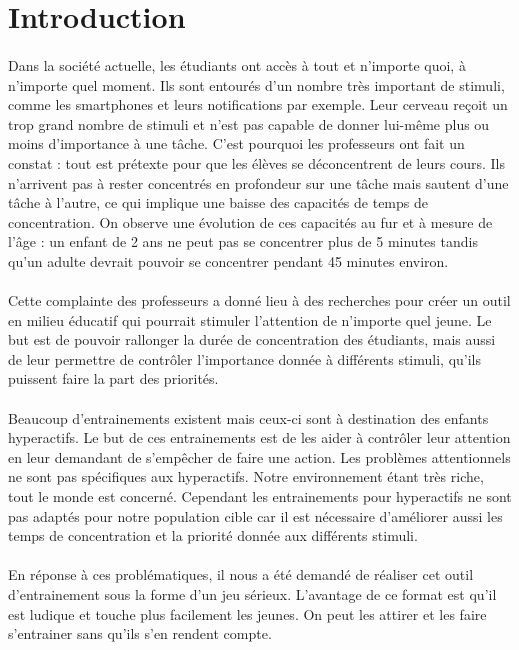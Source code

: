 \section*{Introduction}

\paragraph{}Dans la société actuelle, les étudiants ont accès à tout et n'importe quoi, à n'importe quel moment. Ils sont entourés d'un nombre très important de stimuli, comme les
smartphones et leurs notifications par exemple. Leur cerveau reçoit un trop grand nombre de stimuli et n'est pas capable de donner lui-même plus ou moins d'importance à une tâche.
C'est pourquoi les professeurs ont fait un constat : tout est prétexte pour que les élèves se déconcentrent de leurs cours. Ils n'arrivent pas à rester concentrés en profondeur sur
une tâche mais sautent d'une tâche à l'autre, ce qui implique une baisse des capacités de temps de concentration. On observe une évolution de ces capacités au fur et à mesure de
l'âge : un enfant de 2 ans ne peut pas se concentrer plus de 5 minutes tandis qu'un adulte devrait pouvoir se concentrer pendant 45 minutes environ.

\paragraph{}Cette complainte des professeurs a donné lieu à des recherches pour créer un outil en milieu éducatif qui pourrait stimuler l'attention de n'importe quel jeune. Le but
est de pouvoir rallonger la durée de concentration des étudiants, mais aussi de leur permettre de contrôler l'importance donnée à différents stimuli, qu'ils puissent faire la part des
priorités.

\paragraph{}Beaucoup d'entrainements existent mais ceux-ci sont à destination des enfants hyperactifs. Le but de ces entrainements est de les aider à contrôler leur attention en leur
demandant de s'empêcher de faire une action. Les problèmes attentionnels ne sont pas spécifiques aux hyperactifs. Notre environnement étant très riche, tout le monde est concerné.
Cependant les entrainements pour hyperactifs ne sont pas adaptés pour notre population cible car il est nécessaire d'améliorer aussi les temps de concentration et la priorité donnée
aux différents stimuli.

\paragraph{}En réponse à ces problématiques, il nous a été demandé de réaliser cet outil d'entrainement sous la forme d'un jeu sérieux. L'avantage de ce format est qu'il est ludique et
touche plus facilement les jeunes. On peut les attirer et les faire s'entrainer sans qu'ils s'en rendent compte.

\newpage